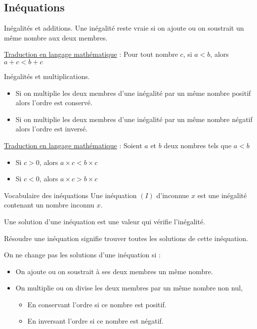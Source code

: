 \begin{pageCours} %


\section{Inéquations}

\begin{PpT}{Inégalités et additions.}
Une inégalité reste vraie si on ajoute ou on soustrait un même nombre aux deux membres.

\underline{Traduction en langage mathématique} :  Pour tout nombre $c$, si $a<b$, alors $a+c<b+c$ 
\end{PpT}

\begin{PpT}{Inégalités et multiplications.}

\begin{itemize}
\item Si on multiplie les deux membres d'une inégalité par un même nombre positif alors l'ordre est conservé.
\item Si on multiplie les deux membres d'une inégalité par un même nombre négatif alors l'ordre est inversé.
\end{itemize}
\underline{Traduction en langage mathématique} :  Soient $a$ et $b$ deux nombres tels que $a<b$
\begin{itemize}
\item Si $c>0$, alors $a\times c<b\times c$
\item Si $c<0$, alors $a\times c>b\times c$
\end{itemize}
\end{PpT}

\begin{DefT}{Vocabulaire des inéquations}
Une inéquation $(I)$ d'inconnue $x$ est une inégalité contenant un nombre inconnu $x$.

Une solution d'une inéquation est une valeur qui vérifie l'inégalité.

Résoudre une inéquation signifie trouver toutes les solutions de cette inéquation.
\end{DefT}

\begin{Pp}
On ne change pas les solutions d'une inéquation si :
\begin{itemize}
\item On ajoute ou on soustrait à ses deux membres un même nombre.
\item On multiplie ou on divise les deux membres par un même nombre non nul,
\begin{itemize}
\item En conservant l'ordre si ce nombre est positif.
\item En inversant l'ordre si ce nombre est négatif.
\end{itemize}
\end{itemize}
\end{Pp}


\end{pageCours}
